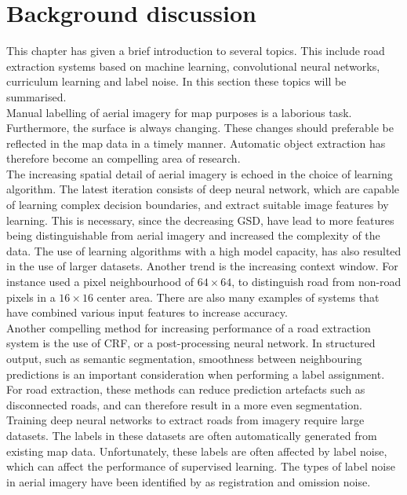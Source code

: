 \section{Background discussion}
\label{sec:backgroundDiscussion}
This chapter has given a brief introduction to several topics. This include road extraction systems based on machine learning, convolutional neural networks, curriculum learning and label noise. In this section these topics will be summarised. \\

Manual labelling of aerial imagery for map purposes is a laborious task. Furthermore, the surface is always changing. These changes should preferable be reflected in the map data in a timely manner. Automatic object extraction has therefore become an compelling area of research.\\

The increasing spatial detail of aerial imagery is echoed in the choice of learning algorithm. The latest iteration consists of deep neural network, which are capable of learning complex decision boundaries, and extract suitable image features by learning. This is necessary, since the decreasing \ac{GSD}, have  lead to more features being distinguishable from aerial imagery and increased the complexity of the data. The use of learning algorithms with a high model capacity, has also resulted in the use of larger datasets. Another trend is the increasing context window. For instance \cite{Mnih_roads_high_res_aerial_images} used a pixel neighbourhood of $64 \times 64$, to distinguish road from non-road pixels in a $16 \times 16$   center area. There are also many examples of systems that have combined various input features to increase accuracy.\\

Another compelling method for increasing performance of a road extraction system is the use of \ac{CRF}, or a post-processing neural network. In structured output, such as semantic segmentation,  smoothness between neighbouring predictions is an important consideration when performing a label assignment. For road extraction, these methods can reduce prediction artefacts such as disconnected roads, and can therefore result in a more even segmentation.\\

Training deep neural networks to extract roads from imagery require large datasets. The labels in these datasets are often automatically generated from existing map data. Unfortunately, these labels are often affected by label noise, which can affect the performance of supervised learning. The types of label noise in aerial imagery have been identified by \cite{Mnih_aerial_images_noisy} as registration and omission noise.  \\

